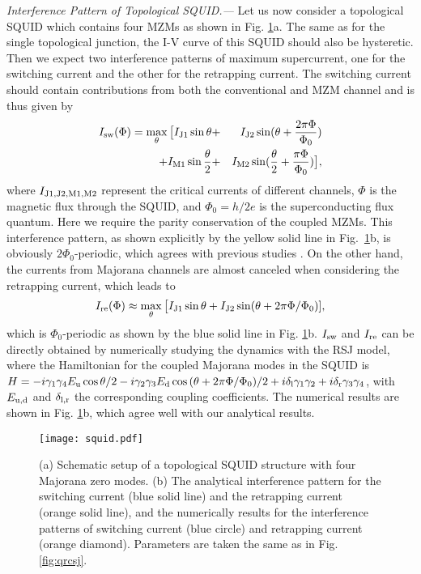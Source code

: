 \documentclass[aps,prl,twocolumn,showpacs,showpacs,10pt,superscriptaddress]{revtex4-1}
\begin{document}
{\it Interference Pattern of Topological SQUID.---}
Let us now consider a topological SQUID which contains four MZMs as shown in Fig. \ref{fig:squid}a. The same as for the single topological junction, the I-V curve of this SQUID should also be hysteretic. Then we expect two interference patterns of maximum supercurrent, one for the switching current and the other for the retrapping current. The switching current should contain contributions from both the conventional and MZM channel and is thus given by
\begin{eqnarray}
I_{\rm sw} (\Phi) = \max_\theta  \big[I_{\rm J1} \sin \theta &+& I_{\rm J2} \sin (\theta + \frac{2\pi \Phi}  {\Phi_0} ) \\\nonumber
                      + I_{\rm M1}  \sin \frac{\theta}{2} &+& I_{\rm M2} \sin (\frac{\theta}{2}+\frac{\pi \Phi}{\Phi_0})\big],
\end{eqnarray}
where $I_{{\rm J}1,{\rm J}2,{\rm M}1,{\rm M}2}$ represent the critical currents of different channels, $\Phi$ is the magnetic flux through the SQUID, and $\Phi_0 = h/2e$ is the superconducting flux quantum. Here we require the parity conservation of the coupled MZMs.
This interference pattern, as shown explicitly by the yellow solid line in Fig.~\ref{fig:squid}b, is obviously $2\Phi_0$-periodic, which agrees with previous studies \cite{beenakker11,veldhorst12}.
On the other hand, the currents from Majorana channels are almost canceled when considering the retrapping current, which leads to
\begin{eqnarray}
I_{\rm re} (\Phi) \approx \max_\theta\big[I_{\rm J1} \sin \theta + I_{\rm J2} \sin (\theta + 2\pi \Phi / \Phi_0) ],
\end{eqnarray}
which is $\Phi_0$-periodic as shown by the blue solid line in Fig. \ref{fig:squid}b.
$I_{\rm sw}$ and $I_{\rm re}$ can be directly obtained by numerically studying the dynamics with the RSJ model, where the Hamiltonian for the coupled Majorana modes in the SQUID is $H= - i\gamma_1 \gamma_4 E_{\rm u} \cos {\theta}/{2}
-  i\gamma_2 \gamma_3 E_{\rm d} \cos {(\theta+ 2\pi\Phi/\Phi_0)}/{2}
+ i\delta_{\rm l} \gamma_1 \gamma_2 + i\delta_{\rm r} \gamma_3 \gamma_4$,
with $E_{\rm u,d}$ and $\delta_{\rm l,r}$ the corresponding coupling coefficients. The numerical results are shown in Fig. \ref{fig:squid}b, which agree well with our analytical results.

\begin{figure}[t]
\begin{center}
\texttt{[image: squid.pdf]}
\caption{(a) Schematic setup of a topological SQUID structure with four Majorana zero modes. (b) The analytical interference pattern for the switching current (blue solid line) and the retrapping current (orange solid line), and the numerically results for the interference patterns of switching current (blue circle) and retrapping current (orange diamond). Parameters are taken the same as in Fig. \ref{fig:qrcsj}.}
\label{fig:squid}
\end{center}
\end{figure}
\end{document}
